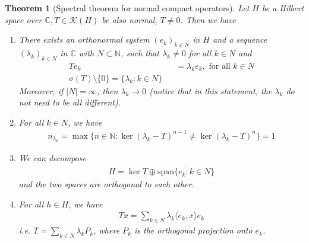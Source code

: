 \documentclass[11pt,a4paper]{article}
\newtheorem{thm}{Theorem}[section]
\theoremstyle{definition}
\begin{document}
\begin{thm}[Spectral theorem for normal compact operators] Let $H$ be a Hilbert space over $\mathbb{C},T \in \mathcal{K}(H)$ be also normal, $T \neq 0$. Then we have
\begin{enumerate}
\item There exists an orthonormal system $(e_k)_{k \in N}$ in $H$ and a sequence $( \lambda_k)_{k \in N}$ in $\mathbb{C}$ with $N \subset \mathbb{N}$, such that $\lambda_k \neq 0$ for all $k \in N$ and 
\begin{align*}
Te_k & &= \lambda_k e_k, \text{ for all } k \in N \\
\sigma(T) \setminus \lbrace 0 \rbrace = \lbrace \lambda_k : k \in N \rbrace
\end{align*}
Moreover, if $|N|= \infty$, then $\lambda_k \to 0$ (notice that in this statement, the $\lambda_k$ do not need to be all different). 
\item For all $k \in N$, we have 
\begin{align*}
n_{\lambda_k} = \max \lbrace n \in \mathbb{N}: \ker ( \lambda_k -T)^{n-1} \neq \ker( \lambda_k -T)^n \rbrace = 1
\end{align*}
\item We can decompose
\begin{align*}
H= \ker T \oplus \overline{\text{span} \{e_k : k \in N \}}
\end{align*}
and the two spaces are orthogonal to each other. 
\item For all $ h \in H$, we have
\begin{align*}
Tx = \sum_{k \in N} \lambda_k \langle e_k, x \rangle e_k
\end{align*}
i.e. $T = \sum_{k \in N} \lambda_k P_k$, where $P_k$ is the orthogonal projection onto $e_k$. 
\end{enumerate}
\end{thm}
\end{document}
